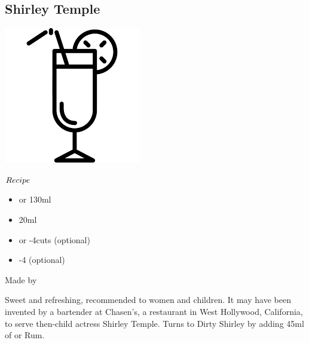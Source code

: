 \subsection{Shirley Temple}
\vspace{-7.4mm}
\hspace{42mm}
\includegraphics[scale=.07]{cocktail_glass_tall.png}
\vspace{2.5mm}
\begin{itembox}[l]{\boldmath $Recipe$}
\begin{itemize}
\setlength{\parskip}{0cm}
\setlength{\itemsep}{0cm}
\item \ga or \llsoda 130ml
\item \gs 20ml
\item \lemon or -4cuts (optional)
\item {}-4 (optional)
\end{itemize}
\vspace{-4mm}
Made by \build
\end{itembox}
Sweet and refreshing, recommended to women and children.
It may have been invented by a bartender at Chasen's, a restaurant in West Hollywood, California, to serve then-child actress Shirley Temple.
Turns to Dirty Shirley by adding 45ml of \vodka or Rum.
